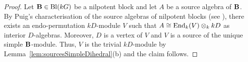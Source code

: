 \begin{proof}
    Let ${\mathbf{B}}\in\operatorname{Bl}(kG)$ be a nilpotent block and let $A$ be a source algebra of ${\mathbf{B}}$. By Puig's characterisation of the source algebras of nilpotent blocks \cite{PuigNilpotentBlocks88} (see \cite[Theorem 8.11.5]{LinckelmannVol2}), there exists an endo-permutation $kD$-module $V$ such that 
    $A\cong \operatorname{End}_k(V)\otimes_k kD$ as interior $D$-algebras. Moreover, $D$ is a vertex of $V$ and $V$ is a source of the unique simple ${\mathbf{B}}$-module. Thus, $V$ is the trivial $kD$-module by Lemma~\ref{lem:sourcesSimpleDihedral}(b)  and the claim follows. 
 \end{proof}


 
